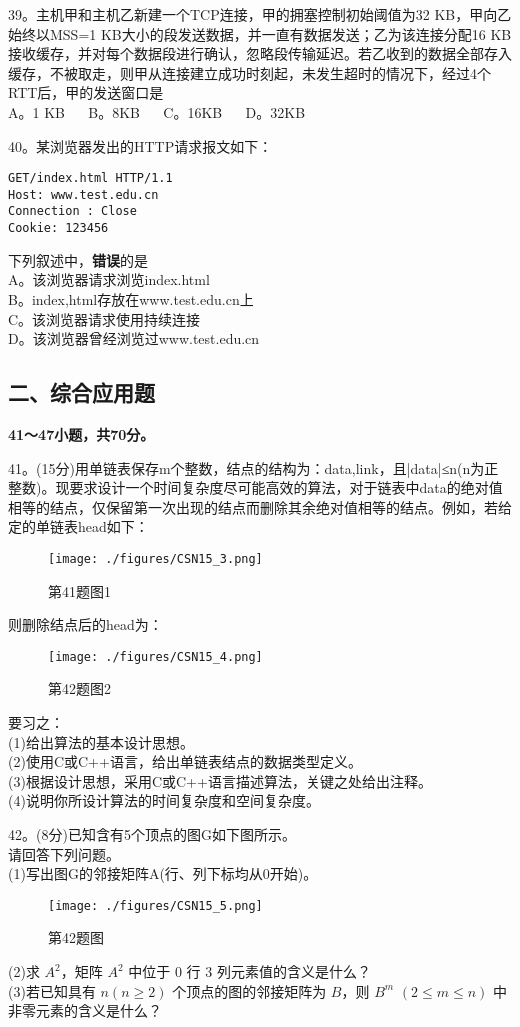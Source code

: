 39。主机甲和主机乙新建一个TCP连接，甲的拥塞控制初始阈值为32 KB，甲向乙始终以MSS=1 KB大小的段发送数据，并一直有数据发送；乙为该连接分配16 KB接收缓存，并对每个数据段进行确认，忽略段传输延迟。若乙收到的数据全部存入缓存，不被取走，则甲从连接建立成功时刻起，未发生超时的情况下，经过4个RTT后，甲的发送窗口是 \\
A。1 KB $\quad$ B。8KB $\quad$ C。16KB $\quad$ D。32KB

40。某浏览器发出的HTTP请求报文如下： \\
\begin{lstlisting}[language=none]
GET/index.html HTTP/1.1
Host: www.test.edu.cn
Connection : Close
Cookie: 123456
\end{lstlisting}
下列叙述中，\textbf{错误}的是 \\
A。该浏览器请求浏览index.html \\
B。index,html存放在www.test.edu.cn上 \\
C。该浏览器请求使用持续连接 \\
D。该浏览器曾经浏览过www.test.edu.cn

\subsection{二、综合应用题}
\textbf{41～47小题，共70分。}

41。(15分)用单链表保存m个整数，结点的结构为：data,link，且|data|≤n(n为正整数)。现要求设计一个时间复杂度尽可能高效的算法，对于链表中data的绝对值相等的结点，仅保留第一次出现的结点而删除其余绝对值相等的结点。例如，若给定的单链表head如下：
\begin{figure}[ht]
\centering
\texttt{[image: ./figures/CSN15\_3.png]}
\caption{第41题图1} \label{CSN15_fig3}
\end{figure}
则删除结点后的head为：
\begin{figure}[ht]
\centering
\texttt{[image: ./figures/CSN15\_4.png]}
\caption{第42题图2} \label{CSN15_fig4}
\end{figure}
要习之： \\
(1)给出算法的基本设计思想。 \\
(2)使用C或C++语言，给出单链表结点的数据类型定义。 \\
(3)根据设计思想，采用C或C++语言描述算法，关键之处给出注释。 \\
(4)说明你所设计算法的时间复杂度和空间复杂度。

42。(8分)已知含有5个顶点的图G如下图所示。 \\
请回答下列问题。 \\
(1)写出图G的邻接矩阵A(行、列下标均从0开始)。
\begin{figure}[ht]
\centering
\texttt{[image: ./figures/CSN15\_5.png]}
\caption{第42题图} \label{CSN15_fig5}
\end{figure}
(2)求 $A^2$，矩阵 $A^2$ 中位于 $0$ 行 $3$ 列元素值的含义是什么？ \\
(3)若已知具有 $n(n\geqslant2)$ 个顶点的图的邻接矩阵为 $B$，则 $B^m$ $(2\leqslant m\leqslant n)$ 中非零元素的含义是什么？

